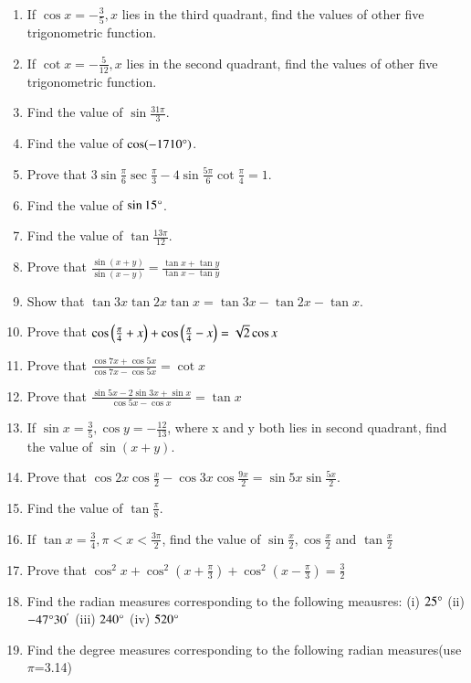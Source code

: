 \begin{enumerate}[label=\thesubsection.\arabic*.,ref=\thesubsection.\theenumi,itemsep=1ex]
%
\item If $\cos x = -\frac{3}{5}, x$ lies in the third quadrant, find the values of other five trigonometric function.
%
\item If $\cot x = - \frac{5}{12}, x$ lies in the second quadrant, find the values of other five trigonometric function.
%
\item Find the value of $\sin \frac{31\pi}{3}$.
%
\item Find the value of $\cos(-1710\degree)$.
%
\item Prove that $3\sin\frac{\pi}{6}\sec\frac{\pi}{3}-4\sin\frac{5\pi}{6}\cot\frac{\pi}{4} = 1.$
%
\item Find the value of $\sin 15\degree$.
%
\item Find the value of $\tan\frac{13\pi}{12}$.
%
%
\item Prove that $\frac{\sin(x+y)}{\sin(x-y)} = \frac{\tan x + \tan y}{\tan x - \tan y}$
%
%
\item Show that
$\tan3x\tan2x\tan x = \tan3x-\tan2x-\tan x$.
%
%
\item Prove that
$\cos\left(\frac{\pi}{4}+x\right) + \cos\left(\frac{\pi}{4}-x\right) = \sqrt 2\cos x$
%
%
\item Prove that $\frac{\cos7x+\cos5x}{\cos7x-\cos5x} = \cot x$
%
%
\item Prove that $\frac{\sin5x-2\sin3x+\sin x}{\cos5x-\cos x} = \tan x$
%
%
\item If $\sin x=\frac{3}{5}, \cos y=-\frac{12}{13}$, where x and y
both lies in second quadrant, find the value of
$\sin(x+y)$.
%
%
\item Prove that
$\cos2x\cos\frac{x}{2}-\cos3x\cos\frac{9x}{2}=\sin5x\sin\frac{5x}{2}$.
%
%
\item Find the value of $\tan\frac{\pi}{8}$.
%
%
\item If $\tan x=\frac{3}{4}, \pi<x<\frac{3\pi}{2}$, find the value of $\sin\frac{x}{2},\cos\frac{x}{2}$ and $\tan\frac{x}{2}$
%
%
\item Prove that
$\cos^{2}x+\cos^{2}(x+\frac{\pi}{3})+\cos^{2}(x-\frac{\pi}{3})=\frac{3}{2}$
%
\item Find the radian measures corresponding to the following meausres:
(i) $25\degree $
(ii) $-47\degree 30^{'}$
(iii) $240\degree$
(iv) $520\degree$
%
\item Find the degree measures corresponding to the following radian measures(use $\pi$=3.14)

\end{enumerate}
